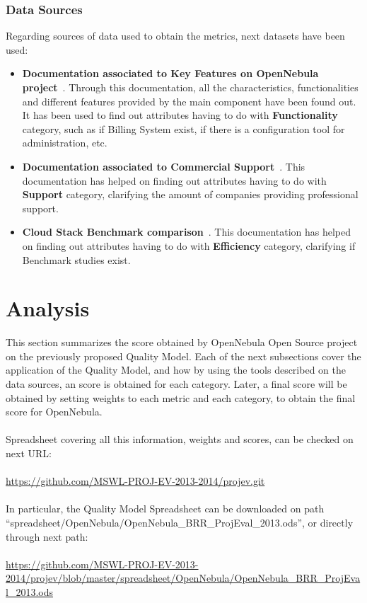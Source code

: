\documentclass[11pt]{article}
\begin{document}
\subsubsection{Data Sources}
Regarding sources of data used to obtain the metrics, next datasets have been used:
\begin{itemize}\itemsep0pt
\item{\textbf{Documentation associated to Key Features on OpenNebula project}~\cite{OPNEB00}}. Through this documentation, all the characteristics, functionalities and different features provided by the main component have been found out. It has been used to find out attributes having to do with \textbf{Functionality} category, such as if Billing System exist, if there is a configuration tool for administration, etc.
\item{\textbf{Documentation associated to Commercial Support}~\cite{OPNEB01}}. This documentation has helped on finding out attributes having to do with \textbf{Support} category, clarifying the amount of companies providing professional support.
\item{\textbf{Cloud Stack Benchmark comparison}~\cite{BENCH00}}. This documentation has helped on finding out attributes having to do with \textbf{Efficiency} category, clarifying if Benchmark studies exist.
\end{itemize}

\section{Analysis}\label{sec:analysis}

This section summarizes the score obtained by OpenNebula Open Source project on the previously proposed Quality Model. Each of the next subsections cover the application of the Quality Model, and how by using the tools described on the data sources, an score is obtained for each category. Later, a final score will be obtained by setting weights to each metric and each category, to obtain the final score for OpenNebula.\\
\\
Spreadsheet covering all this information, weights and scores, can be checked on next URL:\\
\\
\url{https://github.com/MSWL-PROJ-EV-2013-2014/projev.git}\\
\\
In particular, the Quality Model Spreadsheet can be downloaded on path ``spreadsheet/OpenNebula/OpenNebula\_BRR\_ProjEval\_2013.ods'', or directly through next path:\\
\\
\url{https://github.com/MSWL-PROJ-EV-2013-2014/projev/blob/master/spreadsheet/OpenNebula/OpenNebula\_BRR\_ProjEval\_2013.ods}
\end{document}
